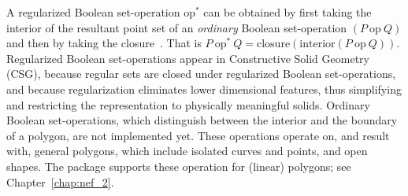 A regularized Boolean set-operation $\mbox{op}^*$ can be obtained by
first taking the interior of the resultant point set of an {\em ordinary}
Boolean set-operation $(P\ \mbox{op}\ Q)$ and then by taking the
closure~\cite{cgal:h-sm-04}. That is
$P\ \mbox{op}^*\ Q = \mbox{closure}(\mbox{interior} (P\ \mbox{op}\ Q))$.
Regularized Boolean set-operations appear in Constructive Solid
Geometry (CSG), because regular sets are closed under regularized
Boolean set-operations, and because regularization eliminates lower
dimensional features, thus simplifying and restricting the
representation to physically meaningful solids.
Ordinary Boolean set-operations, which distinguish between the
interior and the boundary of a polygon, are not implemented yet. These
operations operate on, and result with, general polygons, which
include isolated curves and points, and open shapes. The 
package supports these operation for (linear) polygons; see
Chapter~\ref{chap:nef_2}. 

